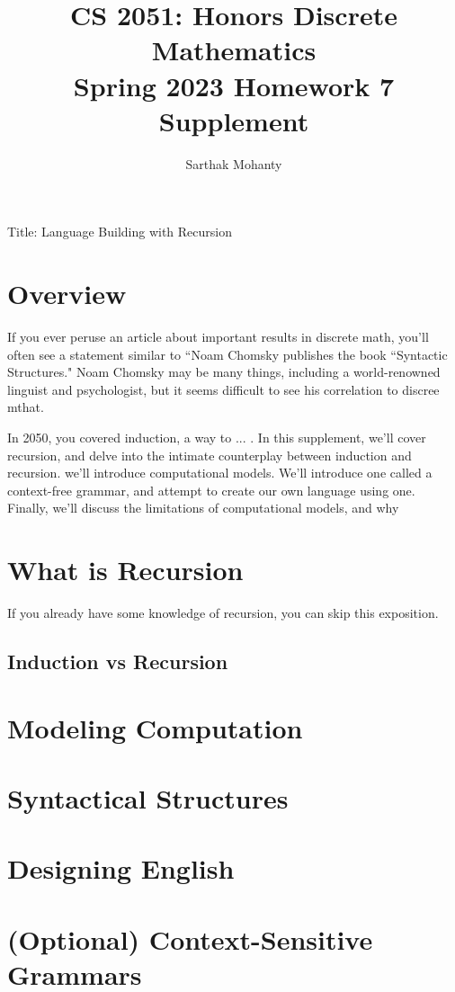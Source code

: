 \documentclass{article}
\title{\vspace{-1cm}CS 2051: Honors Discrete Mathematics \\Spring 2023 Homework 7 Supplement}
\author{Sarthak Mohanty }
\date{}
\begin{document}
\maketitle


Title: Language Building with Recursion

\section*{Overview}

If you ever peruse an article about important results in discrete math, you'll often see a statement similar to ``Noam Chomsky publishes the book “Syntactic Structures."  Noam Chomsky may be many things, including a world-renowned linguist and psychologist, but it seems difficult to see his correlation to discree mthat.

In 2050, you covered induction, a way to ... . In this supplement, we'll cover recursion, and delve into the intimate counterplay between induction and recursion. we'll introduce computational models. We'll introduce one called a context-free grammar, and attempt to create our own language using one. Finally, we'll discuss the limitations of computational models, and why 

\section*{What is Recursion}

If you already have some knowledge of recursion, you can skip this exposition.
\subsection*{Induction vs Recursion}


\section*{Modeling Computation}


\section*{Syntactical Structures}

\section*{Designing English}

\section*{(Optional) Context-Sensitive Grammars}
\end{document}
